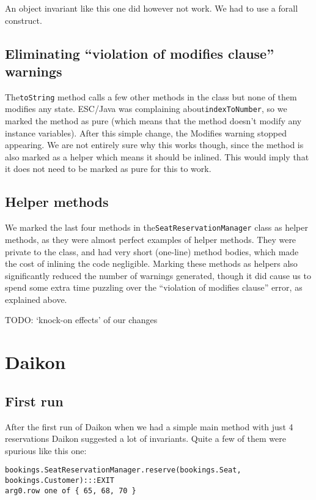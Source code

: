 \documentclass{article}
\begin{document}
An object invariant like this one did however not work. We had to use a forall construct.

\subsection{Eliminating ``violation of modifies clause'' warnings}

The\verb|toString| method calls a few other methods in the class but none of them modifies any state. ESC/Java was complaining about\verb|indexToNumber|, so we marked the method as pure (which means that the method doesn't modify any instance variables). After this simple change, the Modifies warning stopped appearing. We are not entirely sure why this works though, since the method is also marked as a helper which means it should be inlined. This would imply that it does not need to be marked as pure for this to work.

\subsection{Helper methods}

We marked the last four methods in the\verb|SeatReservationManager| class as helper methods, as they were almost perfect examples of helper methods. They were private to the class, and had very short (one-line) method bodies, which made the cost of inlining the code negligible. Marking these methods as helpers also significantly reduced the number of warnings generated, though it did cause us to spend some extra time puzzling over the ``violation of modifies clause'' error, as explained above.

TODO: `knock-on effects' of our changes

\section{Daikon}

\subsection{First run}

After the first run of Daikon when we had a simple main method with just 4 reservations Daikon suggested a lot of invariants. Quite a few of them were spurious like this one:

\noindent
\begin{verbatim}
bookings.SeatReservationManager.reserve(bookings.Seat, bookings.Customer):::EXIT
arg0.row one of { 65, 68, 70 }
\end{verbatim}
\end{document}
